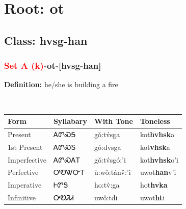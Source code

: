 \needspace{4in}
\section*{Root: ot}
\nopagebreak
{}
\needspace{3in}
\subsection*{Class: hvsg-han}
\nopagebreak
\needspace{2in}
\subsubsection*{\textcolor{Red}{Set A (k)}{-}\textbf{ot}{-}[hvsg-han]}
\nopagebreak
\textbf{Definition: } he/she is building a fire
\\[0.5em]
\begin{tabularx}{\textwidth}{l X X X}%
\toprule%
\textbf{Form}&\textbf{Syllabary}&\textbf{With Tone}&\textbf{Toneless}\\%
\midrule%
Present&ᎪᏛᏍᎦ&gǒ:tv́sga&kot\textbf{hvhsk}a\\%
1st Present&ᎪᏛᏍᎦ&gó:dvsga&kot\textbf{vhsk}a\\%
Imperfective&ᎪᏛᏍᎪᎢ&gǒ:tv́sgó:’i&kot\textbf{hvhsk}o'i\\%
Perfective&ᎤᏬᏔᏅᎢ&ù:wǒ:tánv̌:’i&uwot\textbf{han}v'i\\%
Imperative&ᎰᏛᎦ&ho:tv̀:ga&hot\textbf{hvka}\\%
Infinitive&ᎤᏬᏘᏗ&uwǒ:tdi&uwot\textbf{ht}i\\%
\bottomrule%
\end{tabularx}
\\[1em]